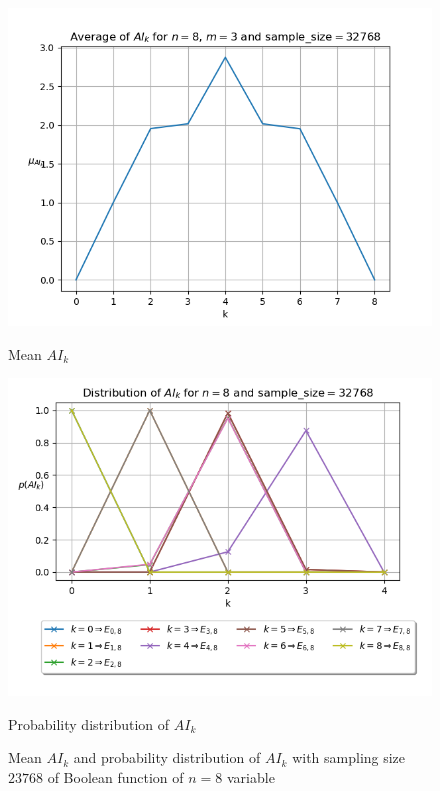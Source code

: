 \documentclass[11pt]{llncs}
\begin{document}
\begin{figure}[ht]
    \centering
    \begin{minipage}[b]{0.45\textwidth}
        \centering
        \includegraphics[width=\textwidth]{images/WPB_3_sample_size_32768_dist.png}
        \caption{Mean $AI_k$}
        \label{fig:averages32768}
    \end{minipage}
    \hfill
    \begin{minipage}[b]{0.5\textwidth}
        \centering
        \includegraphics[width=\textwidth]{images/WPB_3_sample_size_32768_dist_prob.png}
        \caption{Probability distribution of $AI_k$}
        \label{fig:probDist32768}
    \end{minipage}
    \caption{Mean $AI_k$ and probability distribution of $AI_k$ with sampling size $23768$ of Boolean function of $n=8$ variable}
    \label{fig:main2}
\end{figure}
\end{document}
